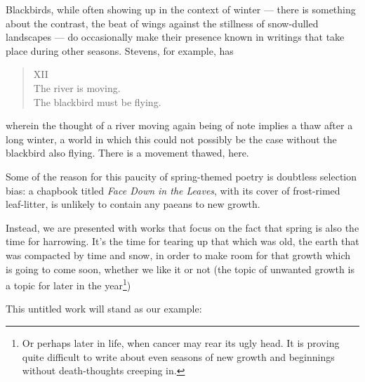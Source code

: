 \documentclass[12pt,oneside]{memoir}
\begin{document}
Blackbirds, while often showing up in the context of winter --- there is something about the contrast, the beat of wings against the stillness of snow-dulled landscapes --- do occasionally make their presence known in writings that take place during other seasons. Stevens, for example, has

\begin{verse}
XII \\
The river is moving. \\
The blackbird must be flying.

\parencite{blackbird}
\end{verse}
wherein the thought of a river moving again being of note implies a thaw after a long winter, a world in which this could not possibly be the case without the blackbird also flying. There is a movement thawed, here.

Some of the reason for this paucity of spring-themed poetry is doubtless selection bias: a chapbook titled \emph{Face Down in the Leaves}, with its cover of frost-rimed leaf-litter, is unlikely to contain any paeans to new growth.

Instead, we are presented with works that focus on the fact that spring is also the time for harrowing. It's the time for tearing up that which was old, the earth that was compacted by time and snow, in order to make room for that growth which is going to come soon, whether we like it or not (the topic of unwanted growth is a topic for later in the year\footnote{Or perhaps later in life, when cancer may rear its ugly head. It is proving quite difficult to write about even seasons of new growth and beginnings without death-thoughts creeping in.})

This untitled work will stand as our example:
\end{document}
